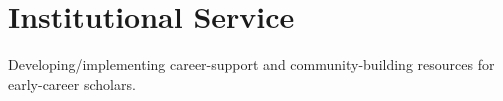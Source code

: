 \section{Institutional Service}

Developing/implementing career-support and community-building resources for early-career scholars.